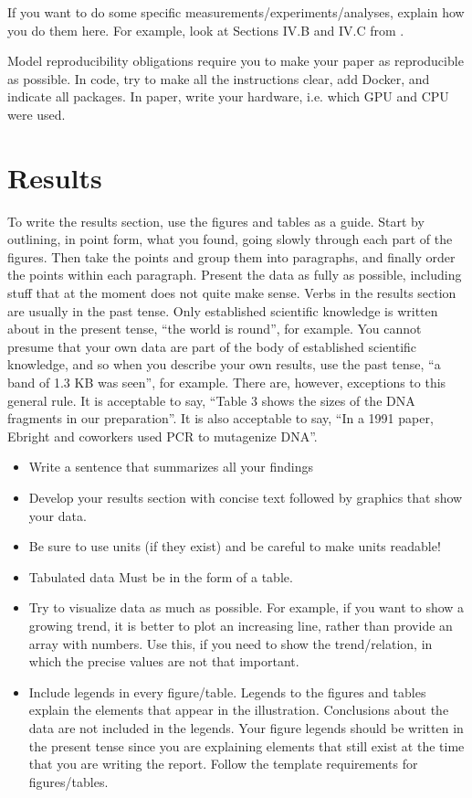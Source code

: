 \documentclass[10pt,conference,compsocconf]{IEEEtran}
\begin{document}
If you want to do some specific measurements/experiments/analyses, explain how you do them here. For example, look at Sections IV.B and IV.C from \cite{grinberg2023rawspectrogram}.

Model reproducibility obligations require you to make your paper as reproducible as possible. In code, try to make all the instructions clear, add Docker, and indicate all packages. In paper, write your hardware, i.e. which GPU and CPU were used. 

\section{Results}\label{sec:results}
To write the results section, use the figures and tables as a guide. Start by outlining, in point form, what you found, going slowly through each part of the figures. Then take the points and group them into paragraphs, and finally order the points within each paragraph. Present the data as fully as possible, including stuff that at the moment does not quite make sense. Verbs in the results section are usually in the past tense. Only established scientific knowledge is written about in the present tense, “the world is round”, for example. You cannot presume
that your own data are part of the body of established scientific knowledge, and so when you describe your own results, use the past tense, “a band of 1.3 KB was seen”, for example. There are, however, exceptions to this general rule. It is acceptable to say, “Table 3 shows the sizes of the DNA fragments in our preparation”. It is also acceptable to say, “In a 1991 paper, Ebright and coworkers used PCR to mutagenize DNA”.

\begin{itemize}
	\item Write a sentence that summarizes all your findings
	\item Develop your results section with concise text followed by graphics that show your data.
	\item Be sure to use units (if they exist) and be careful to make units readable!
	\item Tabulated data Must be in the form of a table.
	\item Try to visualize data as much as possible. For example, if you want to show a growing trend, it is better to plot an increasing line, rather than provide an array with numbers. Use this, if you need to show the trend/relation, in which the precise values are not that important.
	\item Include legends in every figure/table. Legends to the figures and tables explain the elements that appear in the illustration. Conclusions about the data are not included in the legends. Your figure legends should be written in the present tense since you are explaining elements that still exist at the time that you are writing the report. Follow the template requirements for figures/tables.
\end{itemize}
\end{document}
